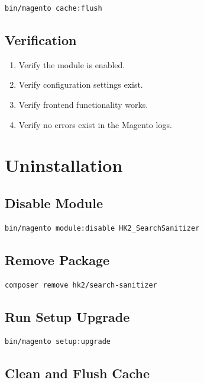 \documentclass[11pt,a4paper]{article}
\begin{document}
\begin{lstlisting}[style=shell]
bin/magento cache:flush
\end{lstlisting}

\subsection{Verification}

\begin{enumerate}
    \item Verify the module is enabled.
    \item Verify configuration settings exist.
    \item Verify frontend functionality works.
    \item Verify no errors exist in the Magento logs.
\end{enumerate}

\section{Uninstallation}

\subsection{Disable Module}

\begin{lstlisting}[style=shell]
bin/magento module:disable HK2_SearchSanitizer
\end{lstlisting}

\subsection{Remove Package}

\begin{lstlisting}[style=shell]
composer remove hk2/search-sanitizer
\end{lstlisting}

\subsection{Run Setup Upgrade}

\begin{lstlisting}[style=shell]
bin/magento setup:upgrade
\end{lstlisting}

\subsection{Clean and Flush Cache}
\end{document}

